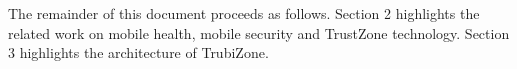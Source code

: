 %
%
%
The remainder of this document proceeds as follows. Section 2 highlights the related work on mobile health, mobile security and TrustZone technology. Section 3 highlights the architecture of TrubiZone.
